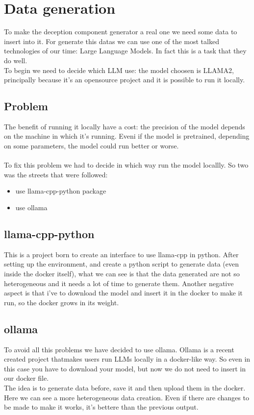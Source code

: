 \chapter{Data generation}
To make the deception component generator a real one we need some data to insert into it.
For generate this datas we can use one of the most talked technologies of our time: Large Language Models. In fact this is a task that they do well.
\\
To begin we need to decide which LLM use: the model choosen is LLAMA2, principally because it's an opensource project and it is possible to run it locally.
\section{Problem}
The benefit of running it locally have a cost: the precision of the model depends on the machine in which it's running. Eveni if the model is pretrained, depending on some parameters, the model could run better or worse.
\\\\
To fix this problem we had to decide in which way run the model locallly. So two was the streets that were followed:
\begin{itemize}
    \item use llama-cpp-python package
    \item use ollama
\end{itemize}
\section{llama-cpp-python}
This is a project born to create an interface to use llama-cpp in python.
After setting up the environment, and create a python script to generate data (even inside the docker itself), what we can see is that the data generated are not so heterogeneous and it needs a lot of time to generate them. Another negative aspect is that i've to download the model and insert it in the docker to make it run, so the docker grows in its weight.
\section{ollama}
To avoid all this problems we have decided to use ollama. Ollama is a recent created project thatmakes users run LLMs locally in a docker-like way. So even in this case you have to download your model, but now we do not need to insert in our docker file.
\\
The idea is to generate data before, save it and then upload them in the docker.
Here we can see a more heterogeneous data creation. Even if there are changes to be made to make it works, it's bettere than the previous output.

